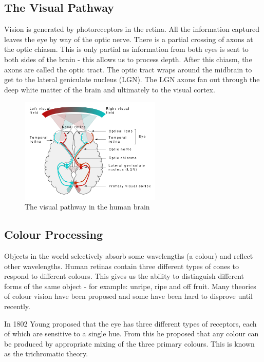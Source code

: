 \documentclass{article}
\begin{document}
	\subsection{The Visual Pathway}
	Vision is generated by photoreceptors in the retina. All the information captured leaves the eye by way of the optic nerve. There is a partial crossing of axons at the optic chiasm. This is only partial as information from both eyes is sent to both sides of the brain - this allows us to process depth. After this chiasm, the axons are called the optic tract. The optic tract wraps around the midbrain to get to the lateral geniculate nucleus (LGN). The LGN axons fan out through the deep white matter of the brain and ultimately to the visual cortex.
	\begin{figure}[h]
		\centering
		\includegraphics[width=0.6\textwidth]{visual_pathway}
		\caption{The visual pathway in the human brain}
		\label{fig:visual pathway}
	\end{figure}
	
	\subsection{Colour Processing}
	Objects in the world selectively absorb some wavelengths (a colour) and reflect other wavelengths. Human retinas contain three different types of cones to respond to different colours. This gives us the ability to distinguish different forms of the same object - for example: unripe, ripe and off fruit. Many theories of colour vision have been proposed and some have been hard to disprove until recently. 
	\par	
	In 1802 Young proposed that the eye has three different types of receptors, each of which are sensitive to a single hue. From this he proposed that any colour can be produced by appropriate mixing of the three primary colours. This is known as the trichromatic theory.
	
\end{document}
